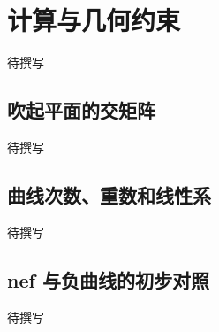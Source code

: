 
% 
% 
% 

\section{计算与几何约束}
\label{g5:sec:2505}

待撰写

\subsection{吹起平面的交矩阵}
\label{g5:subsec:2505:01}
待撰写

\subsection{曲线次数、重数和线性系}
\label{g5:subsec:2505:02}
待撰写

\subsection{nef 与负曲线的初步对照}
\label{g5:subsec:2505:03}
待撰写
